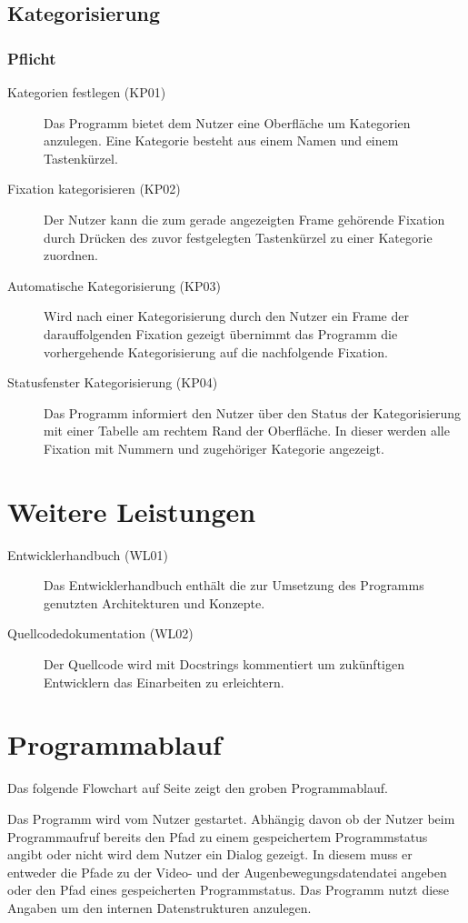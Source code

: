 \documentclass[a4paper]{scrartcl}
\begin{document}
  \subsection{Kategorisierung}
    \subsubsection{Pflicht}
      \begin{description}
	\item[Kategorien festlegen (KP01)] Das Programm bietet dem Nutzer eine Oberfläche um Kategorien anzulegen. Eine Kategorie besteht aus einem Namen und einem Tastenkürzel.
	\item[Fixation kategorisieren (KP02)] Der Nutzer kann die zum gerade angezeigten Frame gehörende Fixation durch Drücken des zuvor festgelegten Tastenkürzel zu einer Kategorie zuordnen.
	\item[Automatische Kategorisierung (KP03)] Wird nach einer Kategorisierung durch den Nutzer ein Frame der darauffolgenden Fixation gezeigt übernimmt das Programm die vorhergehende Kategorisierung auf die nachfolgende Fixation.
	\item[Statusfenster Kategorisierung (KP04)] Das Programm informiert den Nutzer über den Status der Kategorisierung mit einer Tabelle am rechtem Rand der Oberfläche. In dieser werden alle Fixation mit Nummern und zugehöriger Kategorie angezeigt.
      \end{description}
\section{Weitere Leistungen}
  \begin{description}
    \item[Entwicklerhandbuch (WL01)] Das Entwicklerhandbuch enthält die zur Umsetzung des Programms genutzten Architekturen und Konzepte.
    \item[Quellcodedokumentation (WL02)] Der Quellcode wird mit Docstrings kommentiert um zukünftigen Entwicklern das Einarbeiten zu erleichtern.
  \end{description}
  
\section{Programmablauf}
  Das folgende Flowchart auf Seite \pageref{flowchart} zeigt den groben Programmablauf.
  
  Das Programm wird vom Nutzer gestartet. Abhängig davon ob der Nutzer beim Programmaufruf bereits den Pfad zu einem gespeichertem Programmstatus angibt oder nicht wird dem Nutzer ein Dialog gezeigt. In diesem muss er entweder die Pfade zu der Video- und der Augenbewegungsdatendatei angeben oder den Pfad eines gespeicherten Programmstatus. Das Programm nutzt diese Angaben um den internen Datenstrukturen anzulegen.
  
\end{document}
